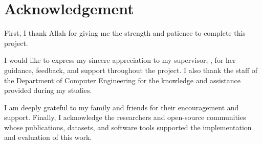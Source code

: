 \chapter*{Acknowledgement}

First, I thank Allah for giving me the strength and patience to complete this
project.

I would like to express my sincere appreciation to my supervisor,
\supervisorname, for her guidance, feedback, and support throughout the project.
I also thank the staff of the Department of Computer Engineering for the
knowledge and assistance provided during my studies.

I am deeply grateful to my family and friends for their encouragement and
support. Finally, I acknowledge the researchers and open-source communities
whose publications, datasets, and software tools supported the implementation
and evaluation of this work.

\clearpage
